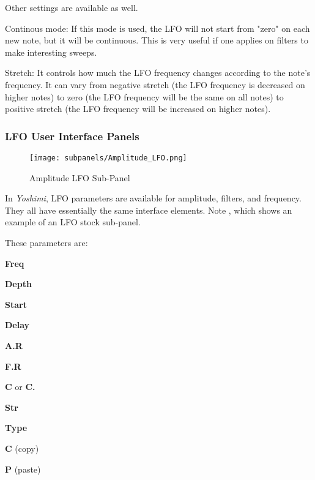    Other settings are available as well.

   Continous mode: If this mode is used, the LFO will not start from "zero" on
   each new note, but it will be continuous. This is very useful if one
   applies on filters to make interesting sweeps.

   Stretch: It controls how much the LFO frequency changes according to the
   note’s frequency. It can vary from negative stretch (the LFO frequency is
   decreased on higher notes) to zero (the LFO frequency will be the same
   on all notes) to positive stretch (the LFO frequency will be
   increased on higher notes).

\subsubsection{LFO User Interface Panels}
\label{subsubsec:lfo_user_interface_panels}

   \setcounter{ItemCounter}{0}      %

\begin{figure}[H]
   \centering
   \texttt{[image: subpanels/Amplitude\_LFO.png]}
   \caption[Amplitude LFO Sub-Panel]{Amplitude LFO Sub-Panel}
   \label{fig:amplitude_lfo}
\end{figure}

   In \textsl{Yoshimi}, LFO parameters are available for amplitude, filters,
   and frequency.  They all have essentially the same interface elements.
   Note , which
   shows an example of an LFO stock sub-panel.

These parameters are:

   \begin{enumber}
      \item \textbf{Freq}
      \item \textbf{Depth}
      \item \textbf{Start}
      \item \textbf{Delay}
      \item \textbf{A.R}
      \item \textbf{F.R}
      \item \textbf{C} or \textbf{C.}
      \item \textbf{Str}
      \item \textbf{Type}
      \item \textbf{C} (copy)
      \item \textbf{P} (paste)
   \end{enumber}


